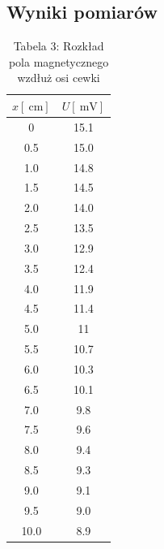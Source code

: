 \documentclass{fizykalab}
\begin{document}
{{{\subsection*{Wyniki pomiarów}
\par
\begin{table}[H]
	\centering
	\begin{tabular}{|c|c|}
		\hline
		$x [\SI{}{\centi\meter}]$ & $U [\SI{}{\milli\volt}]$ \\ \hline
		0                         & 15.1                     \\ \hline
		0.5                       & 15.0                     \\ \hline
		1.0                       & 14.8                     \\ \hline
		1.5                       & 14.5                     \\ \hline
		2.0                       & 14.0                     \\ \hline
		2.5                       & 13.5                     \\ \hline
		3.0                       & 12.9                     \\ \hline
		3.5                       & 12.4                     \\ \hline
		4.0                       & 11.9                     \\ \hline
		4.5                       & 11.4                     \\ \hline
		5.0                       & 11                       \\ \hline
		5.5                       & 10.7                     \\ \hline
		6.0                       & 10.3                     \\ \hline
		6.5                       & 10.1                     \\ \hline
		7.0                       & 9.8                      \\ \hline
		7.5                       & 9.6                      \\ \hline
		8.0                       & 9.4                      \\ \hline
		8.5                       & 9.3                      \\ \hline
		9.0                       & 9.1                      \\ \hline
		9.5                       & 9.0                      \\ \hline
		10.0                      & 8.9                      \\ \hline
	\end{tabular}
	\caption*{Tabela 3: Rozkład pola magnetycznego wzdłuż osi cewki}
\end{table}

}}}
\end{document}

